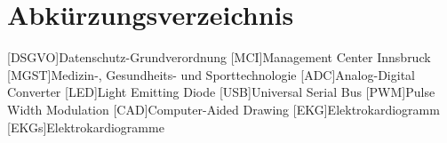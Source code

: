 \section*{Abkürzungsverzeichnis}
\begin{acronym}[DSGVO] %
	[DSGVO]{Datenschutz-Grundverordnung}
	[MCI]{Management Center Innsbruck}
	[MGST]{Medizin-, Gesundheits- und Sporttechnologie}
	[ADC]{Analog-Digital Converter}
	[LED]{Light Emitting Diode}
	[USB]{Universal Serial Bus}
	[PWM]{Pulse Width Modulation}
	[CAD]{Computer-Aided Drawing}
	[EKG]{Elektrokardiogramm}
		{Elektrokardiogramme} %
\end{acronym}